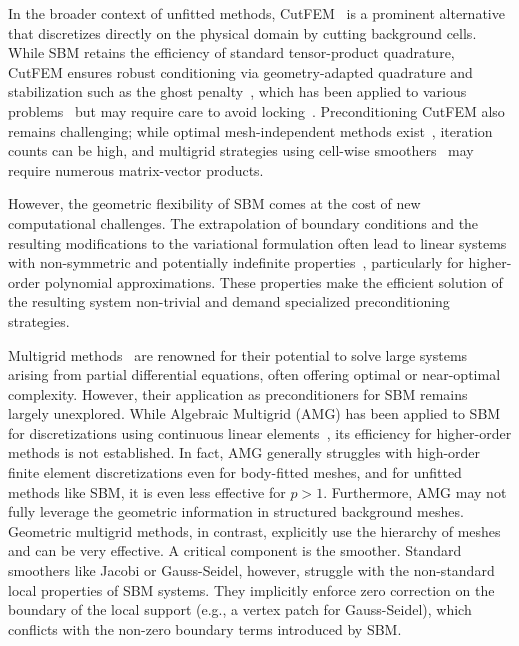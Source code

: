\documentclass{elsarticle}
\begin{document}
In the broader context of unfitted methods, CutFEM~\cite{burman2015cutfem} is a prominent alternative that discretizes
directly on the physical domain by cutting background cells. While SBM retains the efficiency of standard
tensor-product quadrature, CutFEM ensures robust conditioning via geometry-adapted quadrature and stabilization such as
the ghost penalty~\cite{burman2010ghost, wichrowski2025matrix}, which has been applied to various
problems~\cite{burman2014fictitious, hansbo2017cut, claus2019cutfem, gurkan2019stabilized, bergbauer2024high} but may
require care to avoid locking~\cite{badia2022linking,bergbauer2024high,burman2022design}. Preconditioning CutFEM also
remains challenging; while optimal mesh-independent methods exist~\cite{gross2023analysis, gross2021optimal}, iteration
counts can be high, and multigrid strategies using cell-wise smoothers~\cite{bergbauer2024high} may require numerous
matrix-vector products.

However, the geometric flexibility of SBM comes at the cost of new computational challenges. The extrapolation of
boundary conditions and the resulting modifications to the variational formulation often lead to linear systems with
non-symmetric and potentially indefinite properties~\cite{wichrowski2025geometric}, particularly for higher-order
polynomial approximations. These properties make the efficient solution of the resulting system non-trivial and demand
specialized preconditioning strategies.

Multigrid methods~\cite{brandt1977multi, hackbusch1985multi} are renowned for their potential to solve large systems
arising from partial differential equations, often offering optimal or near-optimal complexity. However, their
application as preconditioners for SBM remains largely unexplored. While Algebraic Multigrid (AMG) has been applied to
SBM for discretizations using continuous linear elements~\cite{atallah2020second}, its efficiency for higher-order
methods is not established. In fact, AMG generally struggles with high-order finite element discretizations even for
body-fitted meshes, and for unfitted methods like SBM, it is even less effective for $p > 1$. Furthermore, AMG may not
fully leverage the geometric information in structured background meshes. Geometric multigrid methods, in contrast,
explicitly use the hierarchy of meshes and can be very effective. A critical component is the smoother. Standard
smoothers like Jacobi or Gauss-Seidel, however, struggle with the non-standard local properties of SBM systems. They
implicitly enforce zero correction on the boundary of the local support (e.g., a vertex patch for Gauss-Seidel), which
conflicts with the non-zero boundary terms introduced by SBM.
\end{document}
